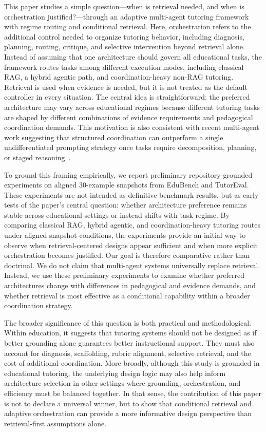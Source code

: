This paper studies a simple question---when is retrieval needed, and when is orchestration justified?---through an adaptive multi-agent tutoring framework with regime routing and conditional retrieval. Here, orchestration refers to the additional control needed to organize tutoring behavior, including diagnosis, planning, routing, critique, and selective intervention beyond retrieval alone. Instead of assuming that one architecture should govern all educational tasks, the framework routes tasks among different execution modes, including classical RAG, a hybrid agentic path, and coordination-heavy non-RAG tutoring. Retrieval is used when evidence is needed, but it is not treated as the default controller in every situation. The central idea is straightforward: the preferred architecture may vary across educational regimes because different tutoring tasks are shaped by different combinations of evidence requirements and pedagogical coordination demands. This motivation is also consistent with recent multi-agent work suggesting that structured coordination can outperform a single undifferentiated prompting strategy once tasks require decomposition, planning, or staged reasoning~\cite{nguyen2025marag,radeva2025coordination}.

To ground this framing empirically, we report preliminary repository-grounded experiments on aligned 30-example snapshots from EduBench and TutorEval. These experiments are not intended as definitive benchmark results, but as early tests of the paper's central question: whether architecture preference remains stable across educational settings or instead shifts with task regime. By comparing classical RAG, hybrid agentic, and coordination-heavy tutoring routes under aligned snapshot conditions, the experiments provide an initial way to observe when retrieval-centered designs appear sufficient and when more explicit orchestration becomes justified. Our goal is therefore comparative rather than doctrinal. We do not claim that multi-agent systems universally replace retrieval. Instead, we use these preliminary experiments to examine whether preferred architectures change with differences in pedagogical and evidence demands, and whether retrieval is most effective as a conditional capability within a broader coordination strategy.

The broader significance of this question is both practical and methodological. Within education, it suggests that tutoring systems should not be designed as if better grounding alone guarantees better instructional support. They must also account for diagnosis, scaffolding, rubric alignment, selective retrieval, and the cost of additional coordination. More broadly, although this study is grounded in educational tutoring, the underlying design logic may also help inform architecture selection in other settings where grounding, orchestration, and efficiency must be balanced together. In that sense, the contribution of this paper is not to declare a universal winner, but to show that conditional retrieval and adaptive orchestration can provide a more informative design perspective than retrieval-first assumptions alone.


